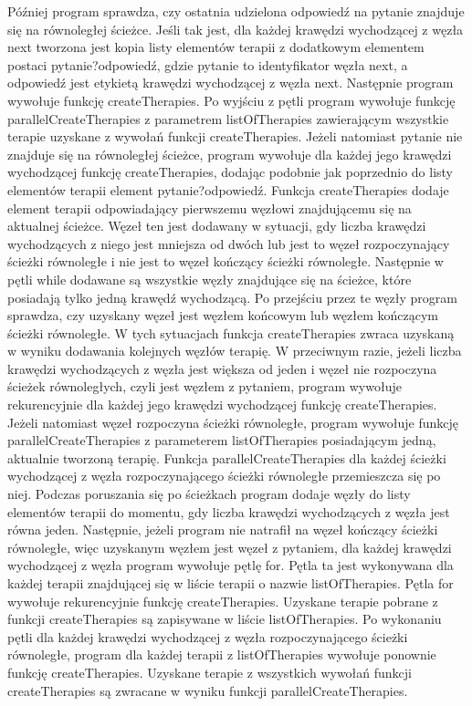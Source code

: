 \documentclass[oneside,a4paper]{book}
\begin{document}
\begin{spacing}{1.5}
Później program sprawdza, czy ostatnia udzielona odpowiedź na pytanie znajduje się na równoległej ścieżce. Jeśli tak jest, dla każdej krawędzi wychodzącej z węzła next tworzona jest kopia listy elementów terapii z dodatkowym elementem postaci pytanie?odpowiedź, gdzie pytanie to identyfikator węzła next, a odpowiedź jest etykietą krawędzi wychodzącej z węzła next. Następnie program wywołuje funkcję createTherapies. Po wyjściu z pętli program wywołuje funkcję parallelCreateTherapies z parametrem listOfTherapies zawierającym wszystkie terapie uzyskane z wywołań funkcji createTherapies. Jeżeli natomiast pytanie nie znajduje się na równoległej ścieżce, program wywołuje dla każdej jego krawędzi wychodzącej funkcję createTherapies, dodając podobnie jak poprzednio do listy elementów terapii element pytanie?odpowiedź. Funkcja createTherapies dodaje element terapii odpowiadający pierwszemu węzłowi znajdującemu się na aktualnej ścieżce. Węzeł ten jest dodawany w sytuacji, gdy liczba krawędzi wychodzących z niego jest mniejsza od dwóch lub jest to węzeł rozpoczynający ścieżki równoległe i nie jest to węzeł kończący ścieżki równoległe. Następnie w pętli while dodawane są wszystkie węzły znajdujące się na ścieżce, które posiadają tylko jedną krawędź wychodzącą. Po przejściu przez te węzły program sprawdza, czy uzyskany węzeł jest węzłem końcowym lub węzłem kończącym ścieżki równoległe. W tych sytuacjach funkcja createTherapies zwraca uzyskaną w wyniku dodawania kolejnych węzłów terapię. W przeciwnym razie, jeżeli liczba krawędzi wychodzących z węzła jest większa od jeden i węzeł nie rozpoczyna ścieżek równoległych, czyli jest węzłem z pytaniem, program wywołuje rekurencyjnie dla każdej jego krawędzi wychodzącej funkcję createTherapies. Jeżeli natomiast węzeł rozpoczyna ścieżki równoległe, program wywołuje funkcję parallelCreateTherapies z parameterem listOfTherapies posiadającym jedną, aktualnie tworzoną terapię. Funkcja parallelCreateTherapies dla każdej ścieżki wychodzącej z węzła rozpoczynającego ścieżki równoległe przemieszcza się po niej. Podczas poruszania się po ścieżkach program dodaje węzły do listy elementów terapii do momentu, gdy liczba krawędzi wychodzących z węzła jest równa jeden. Następnie, jeżeli program nie natrafił na węzeł kończący ścieżki równoległe, więc uzyskanym węzłem jest węzeł z pytaniem, dla każdej krawędzi wychodzącej z węzła program wywołuje pętlę for. Pętla ta jest wykonywana dla każdej terapii znajdującej się w liście terapii o nazwie listOfTherapies. Pętla for wywołuje rekurencyjnie funkcję createTherapies. Uzyskane terapie pobrane z funkcji createTherapies są zapisywane w liście listOfTherapies. Po wykonaniu pętli dla każdej krawędzi wychodzącej z węzła rozpoczynającego ścieżki równoległe, program dla każdej terapii z listOfTherapies wywołuje ponownie funkcję createTherapies. Uzyskane terapie z wszystkich wywołań funkcji createTherapies są zwracane w wyniku funkcji parallelCreateTherapies.


\end{spacing}
\end{document}
